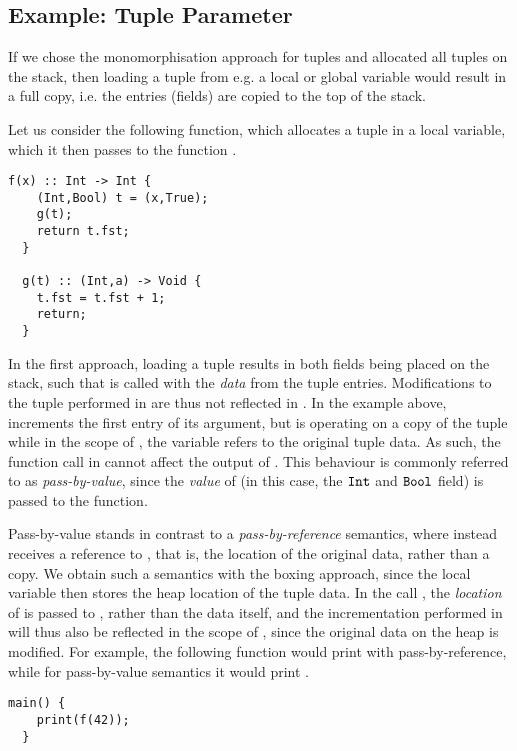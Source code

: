 \subsection{Example: Tuple Parameter}
If we chose the monomorphisation approach for tuples and allocated all tuples on
the stack, then loading a tuple from e.g. a local or global variable would
result in a full copy, i.e. the entries (fields) are copied to
the top of the stack.

Let us consider the following function, which allocates a tuple in a local
variable, which it then passes to the function .
%
\begin{lstlisting}[language=spl]
  f(x) :: Int -> Int {
    (Int,Bool) t = (x,True);
    g(t);
    return t.fst;
  }

  g(t) :: (Int,a) -> Void {
    t.fst = t.fst + 1;
    return;
  }
\end{lstlisting}
%
In the first approach, loading a tuple results in both fields being placed on
the stack, such that  is called with the \emph{data} from the tuple entries.
Modifications to the tuple performed in  are thus not reflected in
. In the example above,  increments the first entry of its
argument, but  is operating on a copy of the tuple while in the scope of
, the variable  refers to the original tuple data.
As such, the function call  in  cannot affect the output of
. This behaviour is commonly referred to as \emph{pass-by-value}, since
the \emph{value} of  (in this case, the $\texttt{Int}$ and $\texttt{Bool}$ field) is
passed to the function.

Pass-by-value stands in contrast to a \emph{pass-by-reference} semantics, where
 instead receives a reference to , that is, the location of the
original data, rather than a copy.
We obtain such a semantics with the boxing approach, since the local variable
 then stores the heap location of the tuple data. In the call ,
the \emph{location} of  is passed to , rather than the data itself,
and the incrementation performed in  will thus also be reflected in the
scope of , since the original data on the heap is modified.
For example, the following  function would print  with
pass-by-reference, while for pass-by-value semantics it would print .
%
\begin{lstlisting}[language=spl]
  main() {
    print(f(42));
  }
\end{lstlisting}

